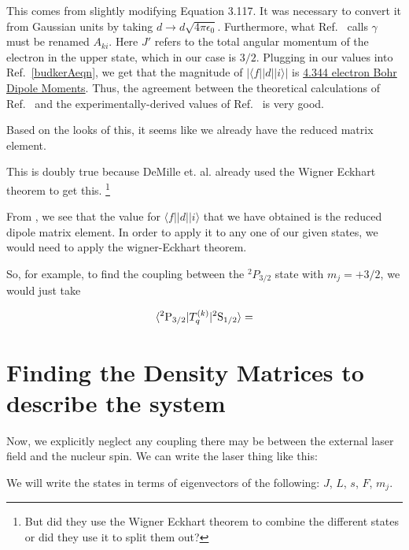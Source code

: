 This comes from slightly modifying Equation 3.117. It was necessary to convert it from Gaussian units by taking $d\rightarrow d \sqrt{4 \pi \epsilon_0}$. Furthermore, what Ref.\ \cite{demilleBudkerKimball} calls $\gamma$ must be renamed $A_{ki}$. Here $J'$ refers to the total angular momentum of the electron in the upper state, which in our case is $3/2$. Plugging in our values into Ref.\ \ref{budkerAeqn}, we get that the magnitude of $|\langle f ||d|| i \rangle|$ is \href{http://www.wolframalpha.com/input/?i=sqrt%283*hbar*c%5E3%2F%284*%282*pi*c%2F407.771+nm%29%5E3%29*4*pi*epsilon_0*4*1.41e8*1%2Fs%29}{4.344 electron Bohr Dipole Moments}.
Thus, the agreement between the theoretical calculations of Ref.\ \cite{safronova2photon} and the experimentally-derived values of Ref.\ \cite{NISTasd} is very good.  

Based on the looks of this, it seems like we already have the reduced matrix element. 


This is doubly true because DeMille et. al. already used the Wigner Eckhart theorem to get this. \footnote{But did they use the Wigner Eckhart theorem to combine the different states or did they use it to split them out?} 

From \cite{demilleBudkerKimball}, we see that the value for $\langle f||d||i\rangle$ that we have obtained is the reduced dipole matrix element. In order to apply it to any one of our given states, we would need to apply the wigner-Eckhart theorem. 

So, for example, to find the coupling between the $^2 P_{3/2}$ state with $m_j=+3/2$, we would just take 

\begin{equation}
\langle ^2 \textnormal{P} _{3/2}|T_q^{(k)}|^2 \textnormal{S}_{1/2}\rangle = 
\end{equation}


\section{Finding the Density Matrices to describe the system}


Now, we explicitly neglect any coupling there may be between the external laser field and the nucleur spin. We can write the laser thing like this: 


We will write the states in terms of eigenvectors of the following: $J$, $L$, $s$, $F$, $m_j$.

